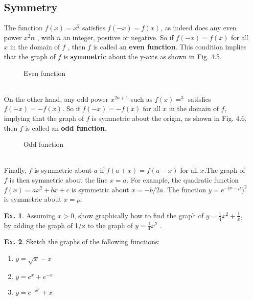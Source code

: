 \documentclass[10pt,a4paper]{book}
\theoremstyle{definition}\newtheorem{definition}{Definition}
\theoremstyle{definition}\newtheorem{fact}{Fact}
\theoremstyle{definition}\newtheorem{ex}{Ex.}
\theoremstyle{definition}\newtheorem{project}{Project}
\theoremstyle{definition}\newtheorem{problem}{Problem}
\theoremstyle{definition}\newtheorem{example}{Example}
\numberwithin{theorem}{chapter}
\numberwithin{corollary}{chapter}
\numberwithin{assumption}{chapter}
\numberwithin{definition}{chapter}
\numberwithin{prop}{chapter}
\numberwithin{notation}{chapter}
\numberwithin{problem}{chapter}
\numberwithin{example}{chapter}
\numberwithin{fact}{chapter}
\numberwithin{ex}{chapter}
\begin{document}
	\subsection{Symmetry}
	The function $f(x) = x^2$ satisfies $f(-x) = f(x)$, as indeed does any even power $x^2n$ , with $n$ an integer, positive or negative. So if $f (-x) = f (x)$ for all $x$ in the domain of $f$ , then $f$ is called an \textbf{even function}. This condition implies that the graph of $f$ is \textbf{symmetric} about the y-axis as shown in Fig. 4.5.
	\begin{figure}[ht]
		\centering
		\caption{Even function}
	\end{figure}
	\\
	On the other hand, any odd power $x^{2n+1}$ such as $f (x) = ^3$ satisfies $f (-x) = -f (x)$. So if $f (-x) = -f (x)$ for all $x$ in the domain of $f$, implying that the graph of $f$ is symmetric about the origin, as shown in Fig. 4.6, then $f$ is called an \textbf{odd function}.
	\begin{figure}[ht]
		\centering
		\caption{Odd function}
	\end{figure}
	\\
	Finally, $f$ is symmetric about $a$ if $f(a+x)=f(a-x)$ for all $x$.The graph of $f$ is then symmetric about the line $x = a$. For example, the quadratic function $f (x) = a x^2 + bx + c$ is symmetric about $x = -b/2a$. The function $y = e^{-(x-\mu})^2$ is symmetric about $x = \mu$.
	
	\begin{ex}
		Assuming $x > 0$, show graphically how to find the graph of $y = \frac{1}{4} x^2 + \frac{1}{x}$, by adding the graph of 1/x to the graph of $y = \frac{1}{4} x^2$ .
	\end{ex}
	
	\begin{ex}
		Sketch the graphs of the following functions:
		\begin{enumerate}[label=(\alph*)]
			\item $y=\sqrt{x}-x$
			\item $y=e^{x}+e^{-x}$
			\item $y=e^{-x^2}+x$
		\end{enumerate}
	\end{ex}
	
\end{document}
